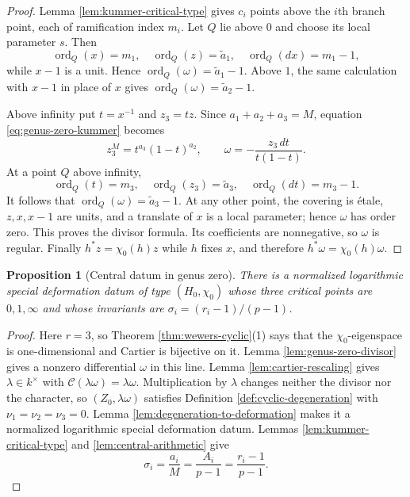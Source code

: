 \documentclass[11pt]{amsart}
\theoremstyle{plain}
\newtheorem{proposition}[theorem]{Proposition}
\theoremstyle{definition}
\numberwithin{equation}{section}
\begin{document}
\begin{proof}
Lemma \ref{lem:kummer-critical-type} gives $c_i$ points above the $i$th
branch point, each of ramification index $m_i$.  Let $Q$ lie above $0$ and
choose its local parameter $s$.  Then
\[
 \operatorname{ord}_Q(x)=m_1,\quad
 \operatorname{ord}_Q(z)=\widetilde a_1,\quad
 \operatorname{ord}_Q(dx)=m_1-1,
\]
while $x-1$ is a unit.  Hence
$\operatorname{ord}_Q(\omega)=\widetilde a_1-1$.  Above $1$, the same
calculation with $x-1$ in place of $x$ gives
$\operatorname{ord}_Q(\omega)=\widetilde a_2-1$.

Above infinity put $t=x^{-1}$ and $z_3=tz$.  Since
$a_1+a_2+a_3=M$, equation \eqref{eq:genus-zero-kummer} becomes
\[
 z_3^M=t^{a_3}(1-t)^{a_2},
 \qquad
 \omega=-\frac{z_3\,dt}{t(1-t)}.
\]
At a point $Q$ above infinity,
\[
 \operatorname{ord}_Q(t)=m_3,\quad
 \operatorname{ord}_Q(z_3)=\widetilde a_3,\quad
 \operatorname{ord}_Q(dt)=m_3-1.
\]
It follows that $\operatorname{ord}_Q(\omega)=\widetilde a_3-1$.  At any
other point, the covering is \'etale, $z,x,x-1$ are units, and a translate
of $x$ is a local parameter; hence $\omega$ has order zero.  This proves
the divisor formula.  Its coefficients are nonnegative, so $\omega$ is
regular.  Finally $h^*z=\chi_0(h)z$ while $h$ fixes $x$, and therefore
$h^*\omega=\chi_0(h)\omega$.
\end{proof}

\begin{proposition}[Central datum in genus zero]
\label{prop:central-genus-zero}
There is a normalized logarithmic special deformation datum of type
$(H_0,\chi_0)$ whose three critical points are $0,1,\infty$ and whose
invariants are $\sigma_i=(r_i-1)/(p-1)$.
\end{proposition}

\begin{proof}
Here $r=3$, so Theorem \ref{thm:wewers-cyclic}(1) says that the
$\chi_0$-eigenspace is one-dimensional and Cartier is bijective on it.
Lemma \ref{lem:genus-zero-divisor} gives a nonzero differential $\omega$ in
this line.  Lemma \ref{lem:cartier-rescaling} gives $\lambda\in k^\times$
with $\mathcal C(\lambda\omega)=\lambda\omega$.  Multiplication by
$\lambda$ changes neither the divisor nor the character, so
$(Z_0,\lambda\omega)$ satisfies Definition
\ref{def:cyclic-degeneration} with $\nu_1=\nu_2=\nu_3=0$.  Lemma
\ref{lem:degeneration-to-deformation} makes it a normalized logarithmic
special deformation datum.  Lemmas \ref{lem:kummer-critical-type} and
\ref{lem:central-arithmetic} give
\[
 \sigma_i=\frac{a_i}{M}=\frac{A_i}{p-1}
 =\frac{r_i-1}{p-1}.
\]
\end{proof}
\end{document}
